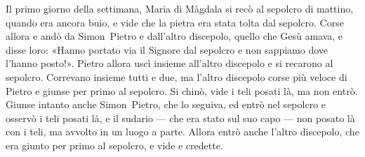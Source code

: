 Il primo giorno della settimana, Maria di Màgdala si recò al sepolcro di mattino, quando era ancora buio, e vide che la pietra era stata tolta dal sepolcro.
Corse allora e andò da Simon~Pietro e dall'altro discepolo, quello che Gesù amava, e disse loro: «Hanno portato via il Signore dal sepolcro e non sappiamo dove l'hanno posto!».
Pietro allora uscì insieme all'altro discepolo e si recarono al sepolcro.
Correvano insieme tutti e due, ma l'altro discepolo corse più veloce di Pietro e giunse per primo al sepolcro.
Si chinò, vide i teli posati là, ma non entrò.
Giunse intanto anche Simon~Pietro, che lo seguiva, ed entrò nel sepolcro e osservò i teli posati là, e il sudario --- che era stato sul suo capo --- non posato là con i teli, ma avvolto in un luogo a parte.
Allora entrò anche l'altro discepolo, che era giunto per primo al sepolcro, e vide e credette.